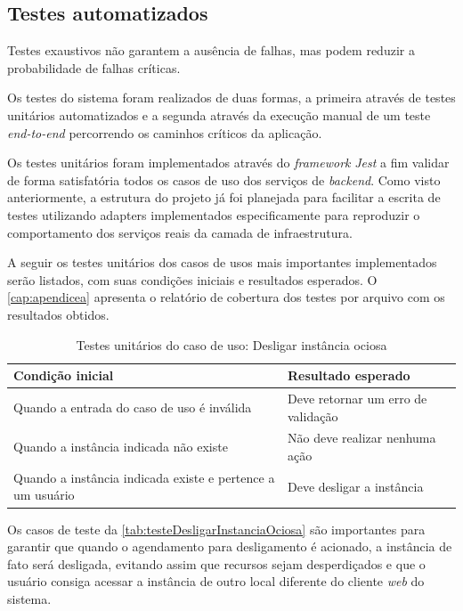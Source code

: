 \subsection{Testes automatizados}
\label{subsec:testesAutomatizados}

Testes exaustivos não garantem a ausência de falhas, mas podem reduzir a probabilidade de falhas críticas. \citep{pressman2016}

Os testes do sistema foram realizados de duas formas, a primeira através de testes unitários automatizados e a segunda através da execução manual de um teste \textit{end-to-end} percorrendo os caminhos críticos da aplicação.

Os testes unitários foram implementados através do \textit{framework} \textit{Jest} a fim validar de forma satisfatória todos os casos de uso dos serviços de \textit{backend}. Como visto anteriormente, a estrutura do projeto já foi planejada para facilitar a escrita de testes utilizando \glspl{adapter} implementados especificamente para reproduzir o comportamento dos serviços reais da camada de infraestrutura.

A seguir os testes unitários dos casos de usos mais importantes implementados serão listados, com suas condições iniciais e resultados esperados. O \autoref{cap:apendicea} apresenta o relatório de cobertura dos testes por arquivo com os resultados obtidos.

\begin{table}[h]
\caption{Testes unitários do caso de uso: Desligar instância ociosa}
\label{tab:testeDesligarInstanciaOciosa}
\begin{tabularx}{\textwidth}{p{} p{}}
\toprule
\textbf{Condição inicial} & \textbf{Resultado esperado} \\ \midrule

Quando a entrada do caso de uso é inválida & Deve retornar um erro de validação \\ \hline

Quando a instância indicada não existe & Não deve realizar nenhuma ação \\ \hline

Quando a instância indicada existe e pertence a um usuário & Deve desligar a instância \\ 

\bottomrule
\end{tabularx}
\end{table}

Os casos de teste da \autoref{tab:testeDesligarInstanciaOciosa} são importantes para garantir que quando o agendamento para desligamento é acionado, a instância de fato será desligada, evitando assim que recursos sejam desperdiçados e que o usuário consiga acessar a instância de outro local diferente do cliente \textit{web} do sistema.


